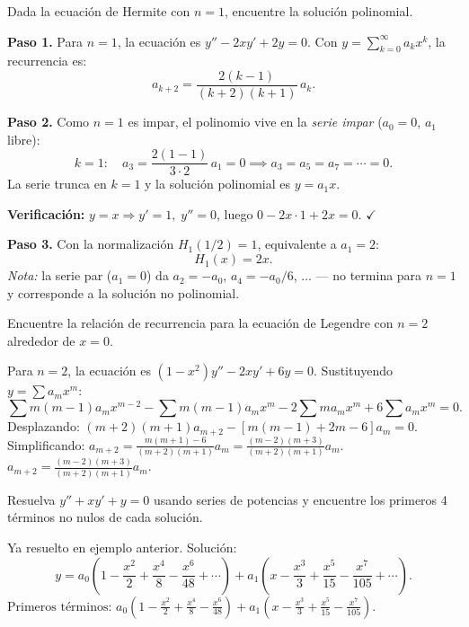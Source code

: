 \begin{prob}
  Dada la ecuación de Hermite con $n=1$, encuentre la solución polinomial.
  \begin{myproof}
    \textbf{Paso 1.} Para $n=1$, la ecuación es $y''-2xy'+2y=0$. Con $y=\sum_{k=0}^{\infty}a_k x^k$, la recurrencia es:
    \[
      a_{k+2}=\frac{2(k-1)}{(k+2)(k+1)}\,a_k.
    \]

    \textbf{Paso 2.} Como $n=1$ es impar, el polinomio vive en la \emph{serie impar} ($a_0=0$, $a_1$ libre):
    \[
      k=1:\quad a_3=\frac{2(1-1)}{3\cdot 2}\,a_1=0
      \implies a_3=a_5=a_7=\cdots=0.
    \]
    La serie trunca en $k=1$ y la solución polinomial es $y=a_1 x$.

    \textbf{Verificación:} $y=x \Rightarrow y'=1,\; y''=0$, luego
    $0-2x\cdot 1+2x=0$. $\checkmark$

    \textbf{Paso 3.} Con la normalización $H_1(1/2)=1$, equivalente a $a_1=2$:
    \[
      \boxed{H_1(x)=2x}.
    \]
    \emph{Nota:} la serie par ($a_1=0$) da $a_2=-a_0$, $a_4=-a_0/6$, $\ldots$ — no termina para $n=1$ y corresponde a la solución no polinomial.
  \end{myproof}
\end{prob}

\begin{prob}
  Encuentre la relación de recurrencia para la ecuación de Legendre con $n=2$ alrededor de $x=0$.
  \begin{myproof}
    Para $n=2$, la ecuación es $(1-x^2)y''-2xy'+6y=0$. Sustituyendo $y=\sum a_m x^m$:
    \[
      \sum m(m-1)a_m x^{m-2} - \sum m(m-1)a_m x^m - 2\sum m a_m x^m + 6\sum a_m x^m=0.
    \]
    Desplazando: $(m+2)(m+1)a_{m+2} - [m(m-1)+2m-6]a_m=0$. Simplificando: $a_{m+2} = \frac{m(m+1)-6}{(m+2)(m+1)}a_m = \frac{(m-2)(m+3)}{(m+2)(m+1)}a_m$. $\boxed{a_{m+2}=\frac{(m-2)(m+3)}{(m+2)(m+1)}a_m}$.
  \end{myproof}
\end{prob}

\begin{prob}
  Resuelva $y'' + x y' + y=0$ usando series de potencias y encuentre los primeros 4 términos no nulos de cada solución.
  \begin{myproof}
    Ya resuelto en ejemplo anterior. Solución:
    \[
      y=a_0\left(1-\frac{x^2}{2}+\frac{x^4}{8}-\frac{x^6}{48}+\cdots\right)
      + a_1\left(x-\frac{x^3}{3}+\frac{x^5}{15}-\frac{x^7}{105}+\cdots\right).
    \]
    $\boxed{\text{Primeros términos: } a_0(1-\frac{x^2}{2}+\frac{x^4}{8}-\frac{x^6}{48}) + a_1(x-\frac{x^3}{3}+\frac{x^5}{15}-\frac{x^7}{105})}$.
  \end{myproof}
\end{prob}

